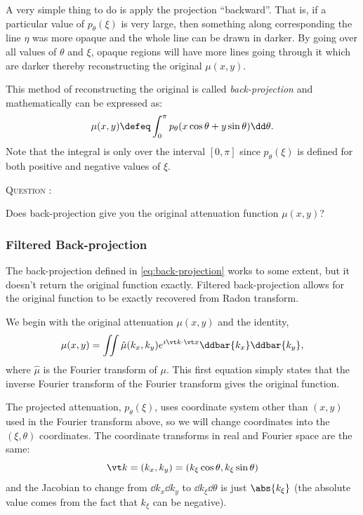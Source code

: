 \documentclass[
  a4paper,             %
  11pt,                %
  oneside,             %
  onecolumn,           %
  bibliography=totoc,  %
  final,               %
]{scrartcl}
\newcounter{question}
\newenvironment{question}{%
  \stepcounter{question}%
  \begin{tcolorbox}[
      colframe=black,
      sharp corners=all,
      boxsep=0.5ex,
    ]
    \noindent\textsc{\large Question \arabic{question}:} %
}{%
  \end{tcolorbox}%
}
\begin{document}
A very simple thing to do is apply the projection \enquote{backward}.  That is,
if a particular value of \(p_{\theta}(\xi)\) is very large, then something along
corresponding the line \(\eta\) was more opaque and the whole line can be drawn
in darker.  By going over all values of \(\theta\) and \(\xi\), opaque regions
will have more lines going through it which are darker thereby reconstructing
the original \(\mu(x, y)\).

This method of reconstructing the original is called \emph{back-projection} and
mathematically can be expressed as:
\begin{equation}
  \label{eq:back-projection}
  \mu(x, y) \defeq \int_{0}^{\pi} p_{\theta}(x \cos \theta + y \sin \theta) \dd \theta.
\end{equation}
Note that the integral is only over the interval \([0, \pi]\) since
\(p_{\theta}(\xi)\) is defined for both positive and negative values of \(\xi\).

\begin{question}
  Does back-projection give you the original attenuation function \(\mu(x, y)\)?
\end{question}

\subsubsection{Filtered Back-projection}
\label{subsubsec:filtered_back-projection}

The back-projection defined in \cref{eq:back-projection} works to some extent,
but it doesn't return the original function exactly.  Filtered back-projection
allows for the original function to be exactly recovered from Radon transform.

We begin with the original attenuation \(\mu(x, y)\) and the identity,
\begin{equation}
  \mu(x, y) = \iint \hat \mu(k_{x}, k_{y}) e^{i \vt k \cdot \vt x} \ddbar{k_{x}} \ddbar{k_{y}},
\end{equation}
where \(\hat \mu\) is the Fourier transform of \(\mu\).  This first equation
simply states that the inverse Fourier transform of the Fourier transform gives
the original function.

The projected attenuation, \(p_{\theta}(\xi)\), uses coordinate system other
than \((x, y)\) used in the Fourier transform above, so we will change
coordinates into the \((\xi, \theta)\) coordinates.  The coordinate transforms
in real and Fourier space are the same:
\begin{equation}
  \vt k = (k_{x}, k_{y}) = (k_{\xi} \cos \theta, k_{\xi} \sin \theta)
\end{equation}
and the Jacobian to change from \(\dd k_{x} \dd k_{y}\) to \(\dd k_{\xi} \dd
\theta\) is just \(\abs{k_{\xi}}\) (the absolute value comes from the fact that
\(k_{\xi}\) can be negative).
\end{document}
